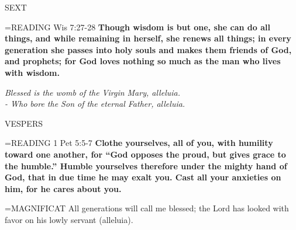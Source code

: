 \begin{flushleft}\normalsize SEXT\\\end{flushleft}

\hangindent=\parindent \small{READING} Wis 7:27-28 \textbf{Though wisdom is but one, she can do all
things, and while remaining in herself, she renews all things; in
every generation she passes into holy souls and makes them friends
of God, and prophets; for God loves nothing so much as the man
who lives with wisdom.}
 
\begin{center}
\textit{Blessed is the womb of the Virgin Mary, alleluia.\\
- Who bore the Son of the eternal Father, alleluia.}
\end{center}

\begin{flushleft}\normalsize VESPERS\\\end{flushleft}

\hangindent=\parindent \small{READING} 1 Pet 5:5-7 \textbf{Clothe yourselves, all of you, with humility
toward one another, for “God opposes the proud, but gives grace to
the humble.” Humble yourselves therefore under the mighty hand
of God, that in due time he may exalt you. Cast all your anxieties
on him, for he cares about you.\\}
 
\hangindent=\parindent \small{MAGNIFICAT  All generations will call me blessed; the Lord has looked
with favor on his lowly servant (alleluia).\\}
 

